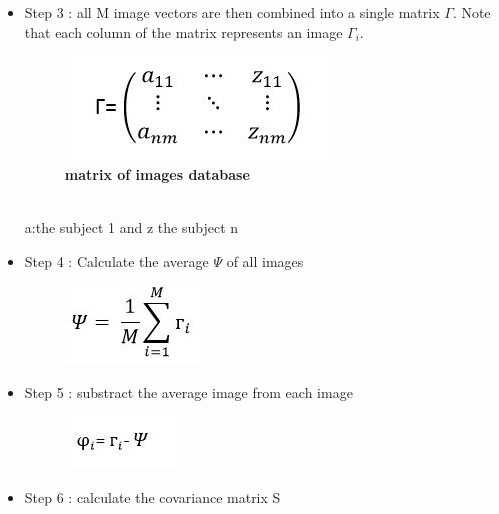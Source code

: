 \begin{itemize}
\item Step 3 : all M image vectors are then combined into a single  matrix $\Gamma$. Note that each column of the matrix represents an image $\Gamma_{i}$.
\begin{figure}[bth]%
\begin{center}
\includegraphics[scale=0.75]{grandematrice}%
\caption{\textbf{matrix of images database}}%
\label{grandematrice}%
\end {center}
\end{figure} 
\\a:the subject 1 and z the subject n
\newpage
\item Step 4 : Calculate the average $\Psi$ of all images
\begin{figure}[bth]%
\begin{center}
\includegraphics[scale=0.75]{moyenne}%
\label{moyenne}%
\end {center}
\end{figure} 
\item Step 5 :  substract the average image  from each image
\begin{figure}[bth]%
\begin{center}
\includegraphics[scale=0.75]{centrage}%
\label{centrage}%
\end {center}
\end{figure}
\item Step 6 : calculate the covariance matrix S
\begin{figure}[bth]%
\begin{center}

\end{center}
\end{figure}
\end{itemize}
